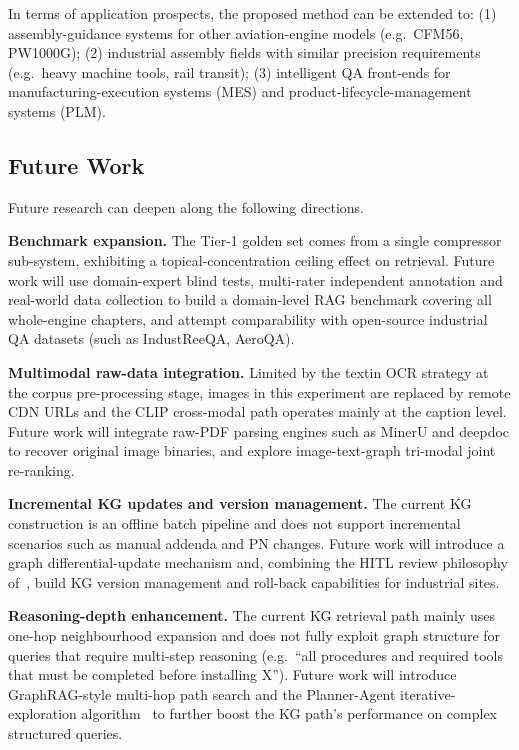 \documentclass[applsci,article,submit,pdftex,moreauthors]{Definitions/mdpi}
\begin{document}
In terms of application prospects, the proposed method can be extended to: (1) assembly-guidance systems for other aviation-engine models (e.g.\ CFM56, PW1000G); (2) industrial assembly fields with similar precision requirements (e.g.\ heavy machine tools, rail transit); (3) intelligent QA front-ends for manufacturing-execution systems (MES) and product-lifecycle-management systems (PLM).

\subsection{Future Work}

Future research can deepen along the following directions.

\textbf{Benchmark expansion.} The Tier-1 golden set comes from a single compressor sub-system, exhibiting a topical-concentration ceiling effect on retrieval. Future work will use domain-expert blind tests, multi-rater independent annotation and real-world data collection to build a domain-level RAG benchmark covering all whole-engine chapters, and attempt comparability with open-source industrial QA datasets (such as IndustReeQA, AeroQA).

\textbf{Multimodal raw-data integration.} Limited by the textin OCR strategy at the corpus pre-processing stage, images in this experiment are replaced by remote CDN URLs and the CLIP cross-modal path operates mainly at the caption level. Future work will integrate raw-PDF parsing engines such as MinerU and deepdoc to recover original image binaries, and explore image-text-graph tri-modal joint re-ranking.

\textbf{Incremental KG updates and version management.} The current KG construction is an offline batch pipeline and does not support incremental scenarios such as manual addenda and PN changes. Future work will introduce a graph differential-update mechanism and, combining the HITL review philosophy of~\citep{amershi2014power}, build KG version management and roll-back capabilities for industrial sites.

\textbf{Reasoning-depth enhancement.} The current KG retrieval path mainly uses one-hop neighbourhood expansion and does not fully exploit graph structure for queries that require multi-step reasoning (e.g.\ ``all procedures and required tools that must be completed before installing X''). Future work will introduce GraphRAG-style multi-hop path search and the Planner-Agent iterative-exploration algorithm~\citep{shen2025hybridrag} to further boost the KG path's performance on complex structured queries.
\end{document}
